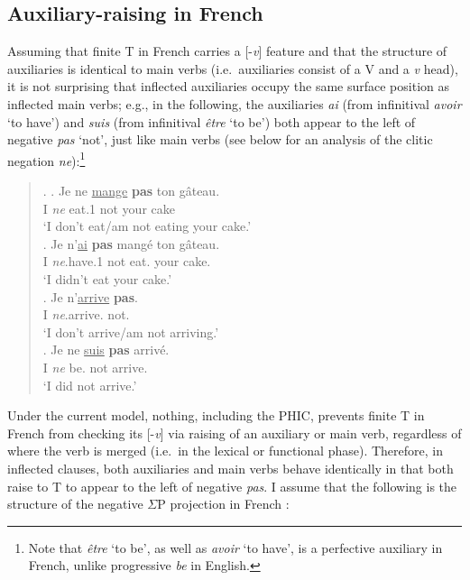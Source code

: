 \subsection{Auxiliary-raising in French}
Assuming that finite T in French carries a [-{\it v}] feature and that the structure of auxiliaries is identical to main verbs (i.e.\ auxiliaries consist of a V and a {\it v} head), it is not surprising that inflected auxiliaries occupy the same surface position as inflected main verbs; e.g., in the following, the auxiliaries {\it ai} (from infinitival {\it avoir} `to have') and {\it suis} (from infinitival {\it \^{e}tre} `to be') both appear to the left of negative {\it pas} `not', just like main verbs (see below for an analysis of the clitic negation {\it ne}):\footnote{Note that {\it \^{e}tre} `to be', as well as {\it avoir} `to have', is a perfective auxiliary in French, unlike progressive {\it be} in English.}

\singlespacing
\begin{minipage}{5.5in}
\begin{quote}
\ex.
\ag. Je ne \underline{mange} \textbf{pas} ton g\^{a}teau.\\
I {\it ne} eat.1\mbox{} not your cake\\
`I don't eat/am not eating your cake.'\\
\bg. Je n'\underline{ai} \textbf{pas} mang\'{e} ton g\^{a}teau.\\
I {\it ne}.have.1\mbox{} not eat.\mbox{} your cake.\\
`I didn't eat your cake.'\\
\cg. Je n'\underline{arrive} \textbf{pas}.\\
I {\it ne}.arrive.\mbox{} not.\\
`I don't arrive/am not arriving.'\\
\dg. Je ne \underline{suis} \textbf{pas} arriv\'{e}.\\
I {\it ne} be.\mbox{} not arrive.\mbox{}\\
`I did not arrive.'\\

\end{quote}
\end{minipage}
\onehalfspacing
Under the current model, nothing, including the PHIC, prevents finite T in French from checking its [-{\it v}] via raising of an auxiliary or main verb, regardless of where the verb is merged (i.e.\ in the lexical or functional phase). Therefore, in inflected clauses, both auxiliaries and main verbs behave identically in that both raise to T to appear to the left of negative {\it pas}. I assume that the following is the structure of the negative $\Sigma$P projection in French \citep{pollock1989}:

